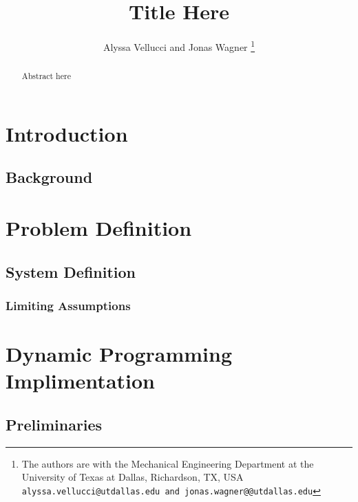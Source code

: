 \documentclass[letterpaper, 10 pt, conference]{ieeeconf}
\title{
    \LARGE \bf
    Title Here
}
\author{
    Alyssa Vellucci and Jonas Wagner
    \thanks{
        The authors are with the Mechanical Engineering Department at the University of Texas at Dallas, Richardson, TX, USA 
    {\tt\small alyssa.vellucci@utdallas.edu and jonas.wagner@@utdallas.edu}
    }
}
\begin{document}
\maketitle
\begin{abstract}
    Abstract here
\end{abstract}


\section{Introduction}

\subsection{Background}






\section{Problem Definition}
\subsection{System Definition}
\subsubsection{Limiting Assumptions}





% 






\section{Dynamic Programming Implimentation}

\subsection{Preliminaries}
\end{document}
